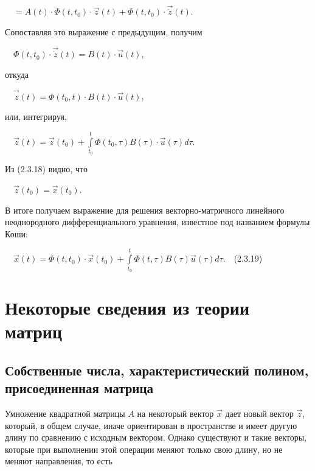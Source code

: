 		\ \     $=A(t)\cdot \Phi (t,t_0)\cdot \vec z(t)+\Phi (t,t_0)\cdot \vec{\dot z}(t)$.



		Сопоставляя это выражение с предыдущим, получим



		\ \  $\Phi (t,t_0)\cdot \vec{\dot z}(t)=B(t)\cdot \vec u(t)$,



		откуда



		\ \  $\vec{\dot z}(t)=\Phi (t_0,t)\cdot B(t)\cdot \vec u(t)$,



		или, интегрируя,



		\ \  $\vec z(t)=\vec z(t_0)+\overset t{\underset{t_0}{\int }}\Phi (t_0,\tau )B(\tau )\cdot \vec u(\tau )\mathit{d\tau }$.



		Из (2.3.18) видно, что 



		\ \  $\vec z(t_0)=\vec x(t_0)$. 



		В итоге получаем выражение для решения векторно-матричного линейного неоднородного дифферен­циального уравнения,
		известное под названием формулы Коши:



		\ \  $\vec x(t)=\Phi (t,t_0)\cdot \vec x(t_0)+\overset t{\underset{t_0}{\int }}\Phi (t,\tau )B(\tau )\vec u(\tau )\mathit{d\tau }$.\ \ (2.3.19)



\bigskip

\section{Некоторые сведения из теории матриц}
\subsection{Собственные числа, характеристический полином,
	  присоединенная матрица}
\hypertarget{RefHeadingToc455659702}{}
		Умножение квадратной матрицы  $A$ на некоторый вектор  $\vec x$ дает новый вектор  $\vec z$, который, в общем случае,
		иначе ориентирован в про­странстве и имеет другую длину по сравнению с исходным вектором. Однако существуют и такие
		векторы, которые при выполнении этой опе­рации меняют только свою длину, но не меняют направления, то есть




